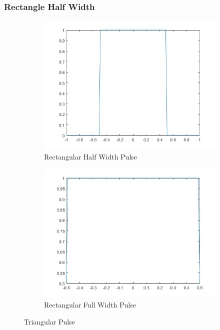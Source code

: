 \documentclass{article}
\begin{document}
\subsubsection{Rectangle Half Width}
\begin{figure}[H]
  \begin{center}
    \begin{subfigure}[b]{0.4\linewidth}
      \includegraphics[width = \linewidth]{Rect_Half.jpg}
      \caption{Rectangular Half Width Pulse}
    \end{subfigure}
    \begin{subfigure}[b]{0.4\linewidth}
      \includegraphics[width = \linewidth]{Rect_Full.jpg}
      \caption{Rectangular Full Width Pulse}
    \end{subfigure}
    \caption{Triangular Pulse}
    \label{fig:Tri_Half}
  \end{center}
\end{figure}
\end{document}
